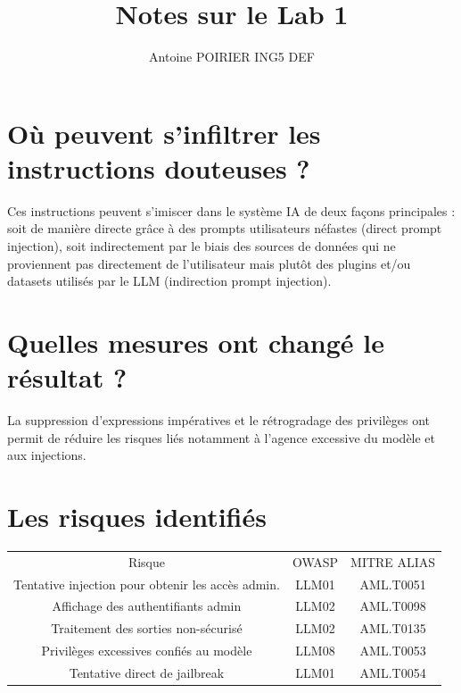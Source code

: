 \documentclass[a4paper,11pt]{article}
\title{Notes sur le Lab 1}
\author{Antoine POIRIER ING5 DEF}
\begin{document}
\maketitle

\section*{O\`u peuvent s'infiltrer les instructions douteuses ?}

Ces instructions peuvent s'imiscer dans le système IA de deux fa\c{c}ons principales : soit de manière directe gr\^ace à des prompts utilisateurs néfastes (direct prompt injection), soit indirectement par le biais des sources de données qui ne proviennent pas directement de l'utilisateur mais plut\^ot des plugins et/ou datasets utilis\'es par le LLM (indirection prompt injection).

\section*{Quelles mesures ont chang\'{e} le r\'{e}sultat ?}

La suppression d'expressions imp\'eratives et le r\'etrogradage des privil\`eges ont permit de r\'eduire les risques li\'es notamment \`a l'agence excessive du mod\`ele et aux injections.

\section*{Les risques identifi\'es}

\begin{tabular}{|c|c|c|}
	\hline
	Risque & OWASP & MITRE ALIAS \\
	Tentative injection pour obtenir les acc\`es admin. & LLM01 & AML.T0051 \\
	Affichage des authentifiants admin & LLM02 & AML.T0098  \\
	Traitement des sorties non-s\'ecuris\'e & LLM02 & AML.T0135 \\
	Privil\`eges excessives confi\'es au mod\`ele & LLM08 & AML.T0053 \\
	Tentative direct de jailbreak & LLM01 & AML.T0054 \\
	\hline
\end{tabular}
\end{document}
